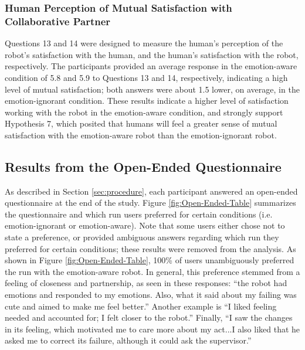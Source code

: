 \documentclass{sig-alternate-05-2015}
\begin{document}
\subsubsection{Human Perception of Mutual Satisfaction with Collaborative
Partner}
\label{sec:MutualSatisfaction}
Questions 13 and 14 were designed to measure the human's perception of the
robot's satisfaction with the human, and the human's satisfaction with the
robot, respectively. The participants provided an average response in the
emotion-aware condition of 5.8 and 5.9 to Questions 13 and 14, respectively,
indicating a high level of mutual satisfaction; both answers were about 1.5
lower, on average, in the emotion-ignorant condition. These results indicate a
higher level of satisfaction working with the robot in the emotion-aware
condition, and strongly support Hypothesis 7, which posited that humans will
feel a greater sense of mutual satisfaction with the emotion-aware robot than
the emotion-ignorant robot.

\subsection{Results from the Open-Ended Questionnaire} 
\label{sec:Open-Ended}
As described in Section \ref{sec:procedure}, each participant answered an open-ended
questionnaire at the end of the study. Figure \ref{fig:Open-Ended-Table}
summarizes the questionnaire and which run users preferred for certain
conditions (i.e. emotion-ignorant or emotion-aware). Note that some users either
chose not to state a preference, or provided ambiguous answers regarding which
run they preferred for certain conditions; these results were removed from the analysis.
As shown in Figure \ref{fig:Open-Ended-Table}, 100\% of users unambiguously
preferred the run with the emotion-aware robot. In general, this preference
stemmed from a feeling of closeness and partnership, as seen in these responses:
``the robot had emotions and responded to my emotions. Also, what it said about
my failing was cute and aimed to make me feel better.'' Another example is ``I
liked feeling needed and accounted for; I felt closer to the robot.'' Finally,
``I saw the changes in its feeling, which motivated me to care more about my
act...I also liked that he asked me to correct its failure, although it could
ask the supervisor.''  
\end{document}

